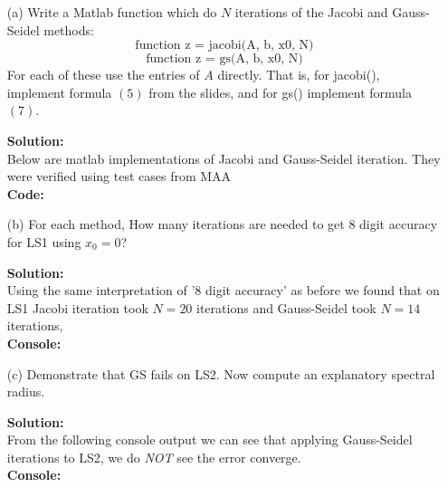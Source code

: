 \documentclass[12pt]{article}
\makeatletter
\theoremstyle{homework}
\newenvironment{exercise}[1]
{\def\@currentlabel{#1}\exercisecore}
{\endexercisecore}
\newcommand{\localhead}[1]{\par\smallskip\noindent\textbf{#1}\nobreak\\}%
\newcommand\solution{\localhead{Solution:}}
\makeatother
\begin{document}
\begin{exercise}{Problem P13} 
  \begin{enumerate}
    \item[(a)] Write a Matlab function which do $N$ iterations of the Jacobi and Gauss-Seidel methods:
    \begin{equation*}
      \text{function z = jacobi(A, b, x0, N)}
    \end{equation*}
    \begin{equation*}
      \text{function z = gs(A, b, x0, N)}
    \end{equation*}
    For each of these use the entries of $A$ directly. That is, for jacobi(), implement formula $(5)$ from the 
    slides, and for gs() implement formula $(7)$. 
    \solution Below are matlab implementations of Jacobi and Gauss-Seidel iteration. They were verified using test cases from MAA \cite{1}\cite{2}\\

    \textbf{Code:}
    \begin{center}
      
    \end{center}

    \begin{center}
      
    \end{center}
    \vspace*{.15in}


    \item[(b)] For each method, How many iterations are needed to get 8 digit accuracy for LS1
    using $x_0 = 0$?
    \solution Using the same interpretation of '8 digit accuracy' as before we found that on LS1
    Jacobi iteration took $N = 20$ iterations and Gauss-Seidel took $N = 14$ iterations,\\

    
    \textbf{Console:}
    \begin{center}
      
    \end{center}


    \item[(c)] Demonstrate that GS fails on LS2. Now compute an explanatory spectral radius. 
    \solution From the following console output we can see that applying Gauss-Seidel iterations to 
    LS2, we do \emph{NOT} see the error converge.\\

    \textbf{Console:}
    \begin{center}
      
    \end{center}
    

\end{enumerate}
\end{exercise}
\end{document}
